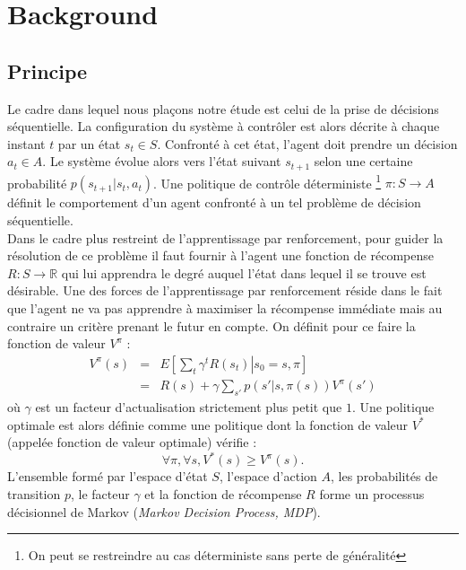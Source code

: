 \documentclass[publibook-draft]{CAp2012}
\begin{document}
\section{Background}
\label{back.sec}
\subsection{Principe}
Le cadre dans lequel nous plaçons notre étude est celui de la prise de décisions séquentielle. La configuration du système à contrôler est alors décrite à chaque instant $t$ par un état $s_t \in S$. Confronté à cet état, l'agent doit prendre un décision $a_t\in A$. Le système évolue alors vers l'état suivant $s_{t+1}$ selon une certaine probabilité $p(s_{t+1}|s_t, a_t)$. Une politique de contrôle déterministe \footnote{On peut se restreindre au cas déterministe sans perte de généralité} $\pi : S\rightarrow A$ définit le comportement d'un agent confronté à un tel problème de décision séquentielle.\\

Dans le cadre plus restreint de l'apprentissage par renforcement, pour guider la résolution de ce problème il faut fournir à l'agent une fonction de récompense $R : S \rightarrow \mathbb{R}$ qui lui apprendra le degré auquel l'état dans lequel il se trouve est désirable. Une des forces de l'apprentissage par renforcement réside dans le fait que l'agent ne va pas apprendre à maximiser la récompense immédiate mais au contraire un critère prenant le futur en compte. On définit pour ce faire la fonction de valeur $V^\pi$ :
\begin{eqnarray}
\label{Vdef.eqn}
V^\pi(s) &=& E\left[\left.\sum_t\gamma^tR(s_t)\right|s_0=s,\pi\right]\\
&=& R(s) + \gamma\sum_{s'}p(s'|s,\pi(s))V^\pi(s')
\label{BellmanV.eqn}
\end{eqnarray}
où $\gamma$ est un facteur d'actualisation strictement plus petit que $1$. Une politique optimale est alors définie comme une politique dont la fonction de valeur $V^*$ (appelée fonction de valeur optimale) vérifie :
\begin{equation}
\forall \pi, \forall s, V^*(s) \geq V^\pi(s).
\end{equation}
L'ensemble formé par l'espace d'état $S$, l'espace d'action $A$, les probabilités de transition $p$, le facteur $\gamma$ et la fonction de récompense $R$ forme un processus décisionnel de Markov ({\it Markov Decision Process, MDP}).\\
\end{document}
